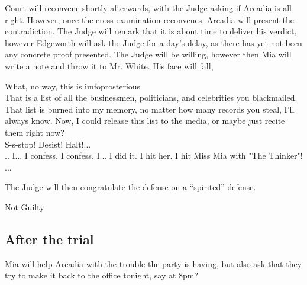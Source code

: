 Court will reconvene shortly afterwards, with the Judge asking if Arcadia is all right. However, once the cross-examination reconvenes, Arcadia will present the contradiction. The Judge will remark that it is about time to deliver his verdict, however Edgeworth will ask the Judge for a day's delay, as there has yet not been any concrete proof presented. The Judge will be willing, however then Mia will write a note and throw it to Mr. White. His face will fall,
\begin{center}
What, no way, this is imfoprosterious
\\
That is a list of all the businessmen, politicians, and celebrities you blackmailed. That list is burned into my memory, no matter how many records you steal, I'll always know. Now, I could release this list to the media, or maybe just recite them right now?\\

S-s-stop! Desist! Halt!...\\
.. I... I confess. I confess. I... I did it. I hit her. I hit Miss Mia with "The Thinker"! ... \\
\end{center}

The Judge will then congratulate the defense on a ``spirited'' defense.
\begin{center}
{\Large Not Guilty}
\end{center}

\subsection{After the trial}
Mia will help Arcadia with the trouble the party is having, but also ask that they try to make it back to the office tonight, say at 8pm?